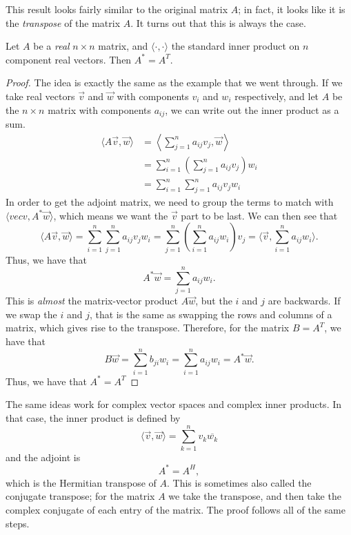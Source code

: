 This result looks fairly similar to the original matrix $A$; in fact, it looks like it is the \emph{transpose} of the matrix $A$. It turns out that this is always the case.

\begin{theorem1}{}
Let $A$ be a \emph{real} $n \times n$ matrix, and $\langle \cdot, \cdot \rangle$ the standard inner product on $n$ component real vectors. Then $A^* = A^T$. 
\end{theorem1}

\begin{proof}
The idea is exactly the same as the example that we went through. If we take real vectors $\vec{v}$ and $\vec{w}$ with components $v_i$ and $w_i$ respectively, and let $A$ be the $n \times n$ matrix with components $a_{ij}$, we can write out the inner product as a sum.
\[
\begin{split}
\langle A\vec{v}, \vec{w} \rangle &= \left\langle \sum_{j=1}^n a_{ij}v_j, \vec{w} \right\rangle \\
&= \sum_{i=1}^n \left(\sum_{j=1}^n a_{ij}v_j \right)w_i \\
&= \sum_{i=1}^n \sum_{j=1}^n a_{ij}v_jw_i
\end{split}
\]
In order to get the adjoint matrix, we need to group the terms to match with $\langle vec{v}, A^*\vec{w} \rangle$, which means we want the $\vec{v}$ part to be last. We can then see that
\[ \langle A \vec{v}, \vec{w} \rangle = \sum_{i=1}^n \sum_{j=1}^n a_{ij}v_jw_i = \sum_{j=1}^n \left( \sum_{i=1}^n a_{ij}w_i \right) v_j = \langle \vec{v}, \sum_{i=1}^n a_{ij}w_i \rangle.  \]
Thus, we have that
\[ A^*\vec{w} = \sum_{j=1}^n a_{ij}w_i . \]
This is \emph{almost} the matrix-vector product $A\vec{w}$, but the $i$ and $j$ are backwards. If we swap the $i$ and $j$, that is the same as swapping the rows and columns of a matrix, which gives rise to the transpose. Therefore, for the matrix $B = A^T$, we have that
\[ B\vec{w} = \sum_{i=1}^n b_{ji}w_i = \sum_{i=1}^n a_{ij}w_i = A^*\vec{w}.\]
Thus, we have that $A^* = A^T$
\end{proof}

\begin{remark}
The same ideas work for complex vector spaces and complex inner products. In that case, the inner product is defined by 
\[ \langle \vec{v}, \vec{w} \rangle = \sum_{k=1}^n v_k\overline{w_k} \] and the adjoint is \[ A^* = A^H,\] which is the Hermitian transpose of $A$. This is sometimes also called the conjugate transpose; for the matrix $A$ we take the transpose, and then take the complex conjugate of each entry of the matrix. The proof follows all of the same steps.
\end{remark}

